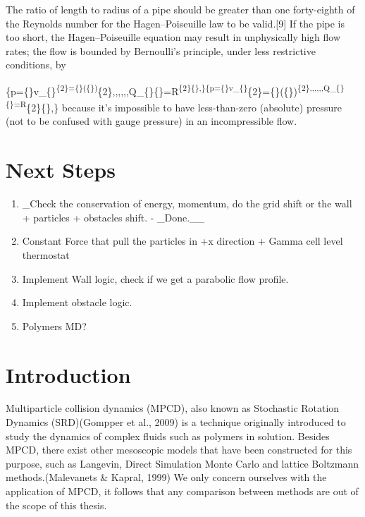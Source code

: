 \documentclass[
]{article}
\providecommand{\tightlist}{%
  \setlength{\itemsep}{0pt}\setlength{\parskip}{0pt}}
\begin{document}
The ratio of length to radius of a pipe should be greater than one
forty-eighth of the Reynolds number for the Hagen--Poiseuille law to be
valid.{[}9{]} If the pipe is too short, the Hagen--Poiseuille equation
may result in unphysically high flow rates; the flow is bounded by
Bernoulli's principle, under less restrictive conditions, by

\{\displaystyle \Delta p=\{\}\rho v\_\{\}\textsuperscript{\{2\}=\{\}\rho \left(\{\}\right)}\{2\},,,\rightarrow ,,,Q\_\{\max \}\{\}=\pi R\textsuperscript{\{2\}\{\},\}\{\displaystyle \Delta p=\{\}\rho v\_\{\}}\{2\}=\{\}\rho \left(\{\}\right)\textsuperscript{\{2\},,,\rightarrow ,,,Q\_\{\max \}\{\}=\pi R}\{2\}\{\},\}
because it's impossible to have less-than-zero (absolute) pressure (not
to be confused with gauge pressure) in an incompressible flow.

\hypertarget{next-steps}{%
\section{Next Steps}\label{next-steps}}

\begin{enumerate}
\def\labelenumi{\arabic{enumi}.}
\tightlist
\item
  \_Check the conservation of energy, momentum, do the grid shift or the
  wall + particles + obstacles shift. - \_Done.\_\_
\item
  Constant Force that pull the particles in +x direction + Gamma cell
  level thermostat
\item
  Implement Wall logic, check if we get a parabolic flow profile.
\item
  Implement obstacle logic.
\item
  Polymers MD?
\end{enumerate}

\hypertarget{introduction}{%
\section{Introduction}\label{introduction}}

Multiparticle collision dynamics (MPCD), also known as Stochastic
Rotation Dynamics (SRD)(Gompper et al., 2009) is a technique originally
introduced to study the dynamics of complex fluids such as polymers in
solution. Besides MPCD, there exist other mesoscopic models that have
been constructed for this purpose, such as Langevin, Direct Simulation
Monte Carlo and lattice Boltzmann methods.(Malevanets \& Kapral, 1999)
We only concern ourselves with the application of MPCD, it follows that
any comparison between methods are out of the scope of this thesis.
\end{document}
